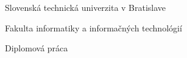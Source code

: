 \begin{center}
\thispagestyle{empty}
{\Large Slovenská technická univerzita v Bratislave}
\par\end{center}{\Large \par}

\begin{center}
{\Large Fakulta informatiky a informačných technológií}
\par\end{center}{\Large \par}

\smallskip{}

\begin{center}

\myEvidenceNumber

\par\end{center}
\vfill{}

\begin{center}
\textbf{\Large \myName}
\par\end{center}{\Large \par}

\medskip{}


\begin{center}
\textbf{\LARGE \myTitle }
\par\end{center}{\huge \par}

\medskip{}


\begin{center}

 {\Large Diplomová práca}

\par\end{center}{\Large \par}

\vfill{}